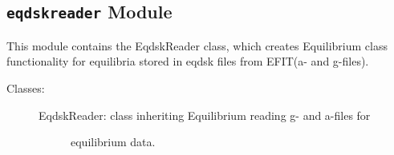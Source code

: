 \documentclass[letterpaper,10pt,english]{sphinxmanual}
\begin{document}
\subsection{\texttt{eqdskreader} Module}
\label{eqtools:eqdskreader-module}\label{eqtools:module-eqtools.eqdskreader}
This module contains the EqdskReader class, which creates Equilibrium class
functionality for equilibria stored in eqdsk files from EFIT(a- and g-files).
\begin{description}
\item[{Classes:}] \leavevmode\begin{description}
\item[{EqdskReader: class inheriting Equilibrium reading g- and a-files for}] \leavevmode
equilibrium data.

\end{description}

\end{description}
\end{document}
